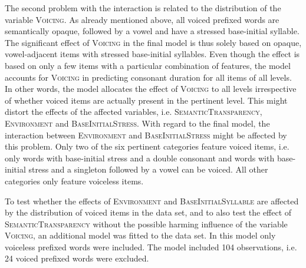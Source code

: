 The second problem with the interaction  
is related to the distribution of the variable \textsc{Voicing}. 
 As already mentioned above, all voiced prefixed words are semantically opaque, followed by a vowel and have a stressed base-initial syllable. The significant effect of \textsc{Voicing} in the final model is thus solely based on opaque, vowel-adjacent items with stressed base-initial syllables. Even though the effect is based on only a few items with a particular combination of features, the model accounts for \textsc{Voicing} in predicting consonant duration for all items of all levels. In other words, the model allocates the effect of \textsc{Voicing} to all levels irrespective of whether voiced items are actually present in the pertinent level. This might distort the effects of the affected variables, i.e. \textsc{SemanticTransparency}, \textsc{Environment} and \textsc{BaseInitialStress}. 
  With regard to the final model, the interaction between \textsc{Environment} and \textsc{BaseInitialStress} might be affected by this problem.
  Only two of the six pertinent categories feature voiced items, i.e. only words with base-initial stress and a double consonant and words with base-initial stress and a singleton followed by a vowel can be voiced. All other categories only feature voiceless items.
  
  \clearpage
  
  To test whether the effects of \textsc{Environment} and \textsc{BaseInitialSyllable} are affected by the distribution of voiced items in the data set, and to also test the effect of \textsc{SemanticTransparency} without the possible harming influence of the variable \textsc{Voicing}, an additional model was fitted to the data set. In this model only voiceless prefixed words were included. The model included 104 observations, i.e. 24 voiced prefixed words were excluded. 
  
  


